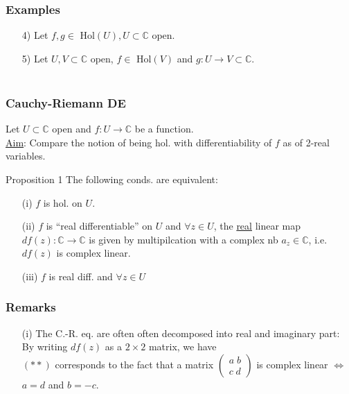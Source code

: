 \documentclass[10pt]{beamer}
\newcommand{\C}{\mathbb{C}}
\begin{document}
{\begin{frame}
\frametitle{Examples}
\begin{itemize}
\item[4)] Let $f,g\in$ Hol$(U), U \subset \C$ open.\\
\vspace{3cm}
\item[5)] Let $U,V \subset \C$ open, $f\in$ Hol$(V)$ and $g:U \rightarrow V \subset \C$.\\
\;\\
\vspace{1.5cm}
\end{itemize}
\end{frame}

\begin{frame}
\frametitle{Cauchy-Riemann DE}
 Let $U \subset \C$ open and $f: U \rightarrow \C$ be a function.\\
\vspace{1cm}
\underline{Aim}: Compare the notion of being hol.  with differentiability of $f$ as of 2-real variables.\\
\vspace{0.2cm}
\begin{block}{Proposition 1}
The following conds. are equivalent:
\begin{itemize}
\item[(i)] $f$ is hol. on $U$.
\item[(ii)] $f$ is ``real differentiable'' on $U$ and $\forall z \in U$, the \underline{real} linear map $df(z):\C \rightarrow \C$ is given by multipilcation with a complex nb $a_z \in \C$, i.e. $df(z)$ is complex linear.
\item[(iii)] $f$ is real diff. and $\forall z \in U$\\
\vspace{1cm}
\end{itemize}
\end{block}
\end{frame}

\begin{frame}
\frametitle{Remarks}
\begin{itemize}
\item[(i)] The C.-R. eq. are often often decomposed into real and imaginary part:\\
\vspace{2cm}
By writing $df(z)$ as a $2\times 2$ matrix,  we have\\
\vspace{2cm}
$(**)$ corresponds to the fact that a matrix $\begin{pmatrix} a\; b \\ c\; d\end{pmatrix}$ is complex linear $\iff$ $a=d$ and $b=-c$.
\end{itemize}
\end{frame}

}
\end{document}
